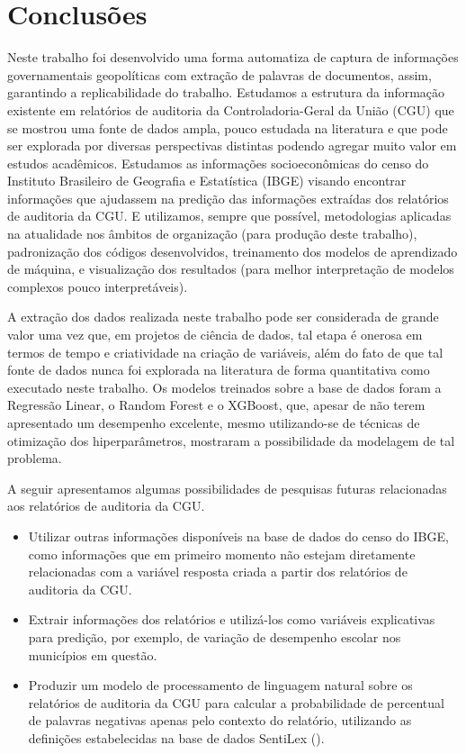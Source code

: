 \chapter{Conclusões}
\label{cap:conclusoes}

Neste trabalho foi desenvolvido uma forma automatiza de captura de informações governamentais geopolíticas com extração de palavras de documentos, assim, garantindo a replicabilidade do trabalho. Estudamos a estrutura da informação existente em relatórios de auditoria da Controladoria-Geral da União (CGU) que se mostrou uma fonte de dados ampla, pouco estudada na literatura e que pode ser explorada por diversas perspectivas distintas podendo agregar muito valor em estudos acadêmicos. Estudamos as informações socioeconômicas do censo do Instituto Brasileiro de Geografia e Estatística (IBGE) visando encontrar informações que ajudassem na predição das informações extraídas dos relatórios de auditoria da CGU. E utilizamos, sempre que possível, metodologias aplicadas na atualidade nos âmbitos de organização (para produção deste trabalho), padronização dos códigos desenvolvidos, treinamento dos modelos de aprendizado de máquina, e visualização dos resultados (para melhor interpretação de modelos complexos pouco interpretáveis).

A extração dos dados realizada neste trabalho pode ser considerada de grande valor uma vez que, em projetos de ciência de dados, tal etapa é onerosa em termos de tempo e criatividade na criação de variáveis, além do fato de que tal fonte de dados nunca foi explorada na literatura de forma quantitativa como executado neste trabalho. Os modelos treinados sobre a base de dados foram a Regressão Linear, o Random Forest e o XGBoost, que, apesar de não terem apresentado um desempenho excelente, mesmo utilizando-se de técnicas de otimização dos hiperparâmetros, mostraram a possibilidade da modelagem de tal problema.

A seguir apresentamos algumas possibilidades de pesquisas futuras relacionadas aos relatórios de auditoria da CGU.

\begin{itemize}
	\item Utilizar outras informações disponíveis na base de dados do censo do IBGE, como informações que em primeiro momento não estejam diretamente relacionadas com a variável resposta criada a partir dos relatórios de auditoria da CGU.
	\item Extrair informações dos relatórios e utilizá-los como variáveis explicativas para predição, por exemplo, de variação de desempenho escolar nos municípios em questão.
	\item Produzir um modelo de processamento de linguagem natural sobre os relatórios de auditoria da CGU para calcular a probabilidade de percentual de palavras negativas apenas pelo contexto do relatório, utilizando as definições estabelecidas na base de dados SentiLex (\citet{Silva2012}).
\end{itemize}

